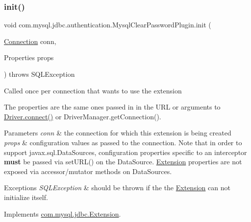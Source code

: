 \subsubsection{\texorpdfstring{init()}{init()}}
{\footnotesize\ttfamily void com.\+mysql.\+jdbc.\+authentication.\+Mysql\+Clear\+Password\+Plugin.\+init (\begin{DoxyParamCaption}\item[{\mbox{\hyperlink{interfacecom_1_1mysql_1_1jdbc_1_1_connection}{Connection}}}]{conn,  }\item[{Properties}]{props }\end{DoxyParamCaption}) throws S\+Q\+L\+Exception}

Called once per connection that wants to use the extension

The properties are the same ones passed in in the U\+RL or arguments to \mbox{\hyperlink{classcom_1_1mysql_1_1jdbc_1_1_non_registering_driver_a834c012e752a01d1ee435b3461bb8218}{Driver.\+connect()}} or Driver\+Manager.\+get\+Connection().


\begin{DoxyParams}{Parameters}
{\em conn} & the connection for which this extension is being created \\
\hline
{\em props} & configuration values as passed to the connection. Note that in order to support javax.\+sql.\+Data\+Sources, configuration properties specific to an interceptor {\bfseries must} be passed via set\+U\+R\+L() on the Data\+Source. \mbox{\hyperlink{interfacecom_1_1mysql_1_1jdbc_1_1_extension}{Extension}} properties are not exposed via accessor/mutator methods on Data\+Sources.\\
\hline
\end{DoxyParams}

\begin{DoxyExceptions}{Exceptions}
{\em S\+Q\+L\+Exception} & should be thrown if the the \mbox{\hyperlink{interfacecom_1_1mysql_1_1jdbc_1_1_extension}{Extension}} can not initialize itself. \\
\hline
\end{DoxyExceptions}


Implements \mbox{\hyperlink{interfacecom_1_1mysql_1_1jdbc_1_1_extension_a79427811058193260bd4df0c38414e88}{com.\+mysql.\+jdbc.\+Extension}}.

\mbox{\label{classcom_1_1mysql_1_1jdbc_1_1authentication_1_1_mysql_clear_password_plugin_aa780df1f828468540fcb6f54fac0d5e3}} 
